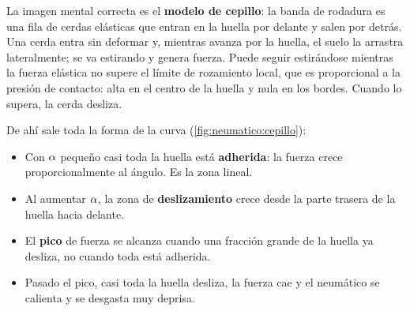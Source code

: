 La imagen mental correcta es el \textbf{modelo de cepillo}: la banda de rodadura
es una fila de cerdas elásticas que entran en la huella por delante y salen por
detrás. Una cerda entra sin deformar y, mientras avanza por la huella, el suelo
la arrastra lateralmente; se va estirando y genera fuerza. Puede seguir
estirándose mientras la fuerza elástica no supere el límite de rozamiento local,
que es proporcional a la presión de contacto: alta en el centro de la huella y
nula en los bordes. Cuando lo supera, la cerda desliza.

De ahí sale toda la forma de la curva (\cref{fig:neumatico:cepillo}):

\begin{itemize}
  \item Con $\alpha$ pequeño casi toda la huella está \textbf{adherida}: la
        fuerza crece proporcionalmente al ángulo. Es la zona lineal.
  \item Al aumentar $\alpha$, la zona de \textbf{deslizamiento} crece desde la
        parte trasera de la huella hacia delante.
  \item El \textbf{pico} de fuerza se alcanza cuando una fracción grande de la
        huella ya desliza, no cuando toda está adherida.
  \item Pasado el pico, casi toda la huella desliza, la fuerza cae y el
        neumático se calienta y se desgasta muy deprisa.
\end{itemize}


